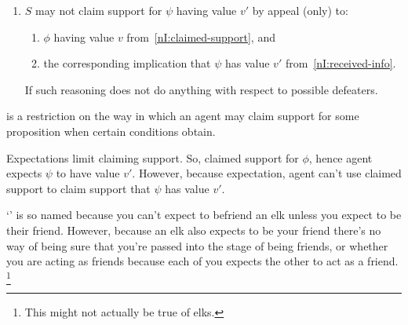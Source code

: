 \begin{note}[\nI{}]
\begin{proposition}[\nI{-}  --- \nI{}]
\begin{enumerate}[ref=(\textsf{NI}:\arabic*), resume*=nI_counter]
    \item\label{nI:going-by-value} \(S\) may not claim support for \(\psi\) having value \(v'\) by appeal (only) to:
      \begin{enumerate}[label=(\roman*)]
      \item \(\phi\) having value \(v\) from~\ref{nI:claimed-support}, and
      \item the corresponding implication that \(\psi\) has value \(v'\) from~\ref{nI:received-info}.
      \end{enumerate}
      {
        \color{red}
        If such reasoning does not do anything with respect to possible defeaters.
      }
    \end{enumerate}
    \vspace{-\topsep}\vspace{-\topsep}
  \end{proposition}
\end{note}

\begin{note}
  \nI{} is a restriction on the way in which an agent may claim support for some proposition when certain conditions obtain.

  Expectations limit claiming support.
  So, claimed support for \(\phi\), hence agent expects \(\psi\) to have value \(v'\).
  However, because expectation, agent can't use claimed support to claim support that \(\psi\) has value \(v'\).
\end{note}

\begin{note}
  `\nI{}' is so named because you can't expect to befriend an elk unless you expect to be their friend.
  However, because an elk also expects to be your friend there's no way of being sure that you're passed into the stage of being friends, or whether you are acting as friends because each of you expects the other to act as a friend.\nolinebreak
  \footnote{
    This might not actually be true of elks.
  }
\end{note}

